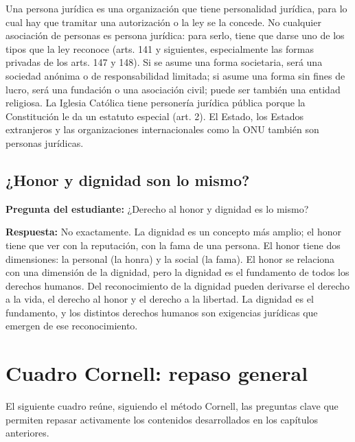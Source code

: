 \documentclass[12pt,oneside]{book}
\begin{document}
Una persona jurídica es una organización que tiene personalidad jurídica, para lo cual hay que tramitar una autorización o la ley se la concede. No cualquier asociación de personas es persona jurídica: para serlo, tiene que darse uno de los tipos que la ley reconoce (arts. 141 y siguientes, especialmente las formas privadas de los arts. 147 y 148). Si se asume una forma societaria, será una sociedad anónima o de responsabilidad limitada; si asume una forma sin fines de lucro, será una fundación o una asociación civil; puede ser también una entidad religiosa. La Iglesia Católica tiene personería jurídica pública porque la Constitución le da un estatuto especial (art. 2). El Estado, los Estados extranjeros y las organizaciones internacionales como la ONU también son personas jurídicas.

\section{¿Honor y dignidad son lo mismo?}

\textbf{Pregunta del estudiante:} ¿Derecho al honor y dignidad es lo mismo?

\textbf{Respuesta:} No exactamente. La dignidad es un concepto más amplio; el honor tiene que ver con la reputación, con la fama de una persona. El honor tiene dos dimensiones: la personal (la honra) y la social (la fama). El honor se relaciona con una dimensión de la dignidad, pero la dignidad es el fundamento de todos los derechos humanos. Del reconocimiento de la dignidad pueden derivarse el derecho a la vida, el derecho al honor y el derecho a la libertad. La dignidad es el fundamento, y los distintos derechos humanos son exigencias jurídicas que emergen de ese reconocimiento.

\chapter{Cuadro Cornell: repaso general}

El siguiente cuadro reúne, siguiendo el método Cornell, las preguntas clave que permiten repasar activamente los contenidos desarrollados en los capítulos anteriores.
\end{document}

